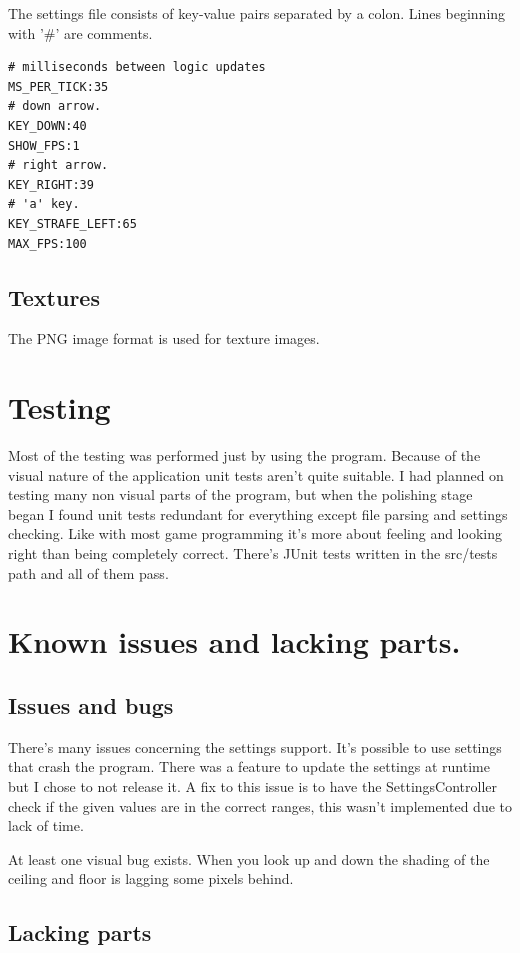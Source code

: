 \documentclass[a4paper,10pt]{article}
\begin{document}
The settings file consists of key-value pairs separated by a colon. Lines
beginning with '\#' are comments.

\begin{verbatim}
# milliseconds between logic updates
MS_PER_TICK:35
# down arrow.
KEY_DOWN:40
SHOW_FPS:1
# right arrow.
KEY_RIGHT:39
# 'a' key.
KEY_STRAFE_LEFT:65
MAX_FPS:100
\end{verbatim}

\subsection{Textures}

The PNG image format is used for texture images.

\section{Testing}

Most of the testing was performed just by using the program. Because of the
visual nature of the application unit tests aren't quite suitable. I had planned
on testing many non visual parts of the program, but when the polishing stage
began I found unit tests redundant for everything except file parsing and
settings checking. Like with most game programming it's more about feeling and
looking right than being completely correct. There's JUnit tests written in the
src/tests path and all of them pass.

\section{Known issues and lacking parts.}

\subsection{Issues and bugs}

There's many issues concerning the settings support. It's possible to use
settings that crash the program. There was a feature to update the settings at
runtime but I chose to not release it. A fix to this issue is to have the
SettingsController check if the given values are in the correct ranges, this
wasn't implemented due to lack of time.

At least one visual bug exists. When you look up and down the shading of the
ceiling and floor is lagging some pixels behind.

\subsection{Lacking parts}
\end{document}
